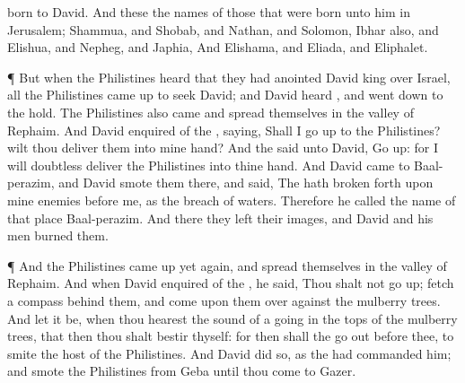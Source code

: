 {born to
David.
And these
{} the
names of those that were
born unto him in
Jerusalem;
Shammua, and
Shobab, and
Nathan, and
Solomon,
Ibhar also, and
Elishua, and
Nepheg, and
Japhia,
And
Elishama, and
Eliada, and
Eliphalet.
\par }{\PP {}¶ But when the
Philistines
heard that they had
anointed
David
king over
Israel, all the
Philistines came
up to
seek
David; and
David
heard
{}, and went
down to the
hold.
The
Philistines also
came and
spread themselves in the
valley of
Rephaim.
And
David
enquired of the
{},
saying, Shall I go
up to the
Philistines? wilt thou
deliver them into mine
hand? And the
{}
said unto
David, Go
up: for I will
doubtless
deliver the
Philistines into thine
hand.
And
David
came to
Baal-perazim, and
David
smote them there, and
said, The
{} hath broken
forth upon mine
enemies
before me, as the
breach of
waters. Therefore he
called the
name of that
place
Baal-perazim.
And there they
left their
images, and
David and his
men
burned them.
\par }{\PP {}¶ And the
Philistines came
up yet
again, and
spread themselves in the
valley of
Rephaim.
And when
David
enquired of the
{}, he
said, Thou shalt not go
up;
{} fetch a
compass
behind them, and
come upon them over
against the mulberry
trees.
And let it be, when thou
hearest the
sound of a
going in the
tops of the mulberry
trees, that then thou shalt
bestir thyself: for then shall the
{} go
out
before thee, to
smite the
host of the
Philistines.
And
David did
so, as the
{} had
commanded him; and
smote the
Philistines from
Geba until thou
come to
Gazer.

}
